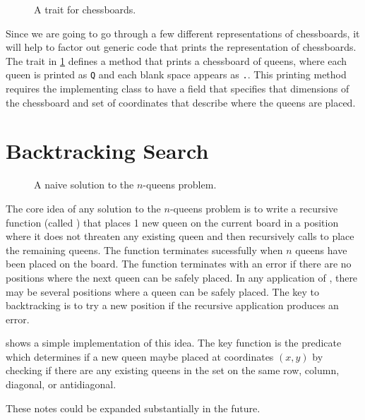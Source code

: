 \documentclass[9pt]{extbook}
\begin{document}
\begin{figure}
\caption{A trait for chessboards.}
\label{ChessBoardLike}
\end{figure}

Since we are going to go through a few different representations of chessboards,
it will help to factor out generic code that prints the representation of
chessboards. The  trait in \cref{ChessBoardLike}
defines a  method that prints a chessboard of queens,
where each queen is printed as \texttt{Q} and each blank space appears as
\texttt{.}. This printing method requires the implementing class to have
a field that specifies that dimensions of the chessboard and set of coordinates
that describe where the queens are placed.

\section{Backtracking Search}

\begin{figure}
\caption{A naive solution to the $n$-queens problem.}
\label{NaiveQueens}
\end{figure}

The core idea of any solution to the $n$-queens problem is to write a recursive
function (called ) that places 1 new queen on the current
board in a position where it does not threaten any existing queen and then
recursively calls  to place the remaining queens. The
function terminates sucessfully when $n$ queens have been placed on the board.
The function terminates with an error if there are no positions where the next
queen can be safely placed. In any application of , there may
be several positions where a queen can be safely placed. The key to backtracking
is to try a new position if the recursive application produces an error.

 shows a simple implementation of this idea. The key function
is the  predicate which determines if a new queen
maybe placed at coordinates $(x,y)$ by checking if there are any existing
queens in the set  on the same row, column, diagonal,
or antidiagonal.

\begin{instructor}
These notes could be expanded substantially in the future.
\end{instructor}
\end{document}
